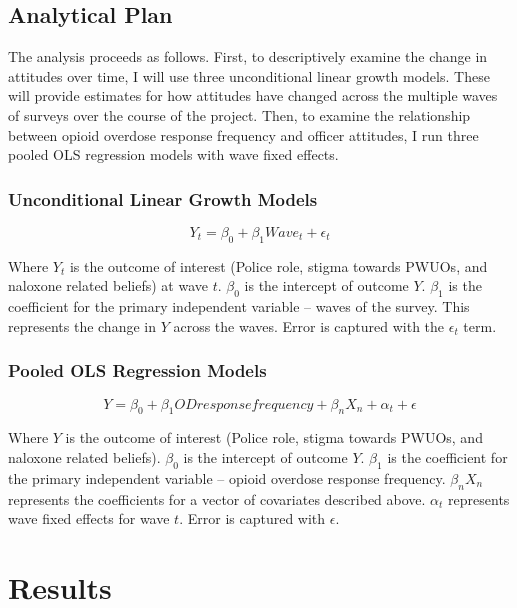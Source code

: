 \subsection{Analytical Plan}

The analysis proceeds as follows. First, to descriptively examine the change in attitudes over time, I will use three unconditional linear growth models. These will provide estimates for how attitudes have changed across the multiple waves of surveys over the course of the project. Then, to examine the relationship between opioid overdose response frequency and officer attitudes, I run three pooled OLS regression models with wave fixed effects.

\subsubsection{Unconditional Linear Growth Models}

\[Y_t = \beta_0 + \beta_1 Wave_t + \epsilon_t \]

Where \(Y_t\) is the outcome of interest (Police role, stigma towards PWUOs, and naloxone related beliefs) at wave \(t\). \(\beta_0\) is the intercept of outcome \(Y\). \(\beta_1\) is the coefficient for the primary independent variable -- waves of the survey. This represents the change in \(Y\) across the waves. Error is captured with the \(\epsilon_t\) term.

\subsubsection{Pooled OLS Regression Models}

\[Y = \beta_0 + \beta_1 OD response frequency + \beta_n X_n + \alpha_t + \epsilon \]

Where \(Y\) is the outcome of interest (Police role, stigma towards PWUOs, and naloxone related beliefs). \(\beta_0\) is the intercept of outcome \(Y\). \(\beta_1\) is the coefficient for the primary independent variable -- opioid overdose response frequency. \(\beta_n X_n\) represents the coefficients for a vector of covariates described above. \(\alpha_t\) represents wave fixed effects for wave \(t\). Error is captured with \(\epsilon\).

\section{Results}

